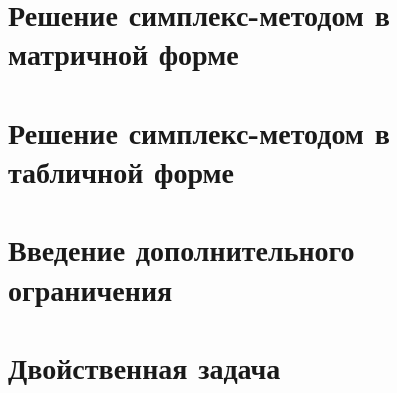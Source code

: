 \section{Решение симплекс-методом в матричной форме}

\section{Решение симплекс-методом в табличной форме}

\section{Введение дополнительного ограничения}

\section{Двойственная задача}

